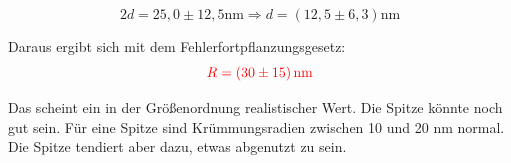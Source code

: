 \begin{equation*}
    2d = 25,0\pm12,5\mathrm{nm} \Rightarrow d = (12,5\pm 6,3) \mathrm{nm} 
\end{equation*}

Daraus ergibt sich mit dem Fehlerfortpflanzungsgesetz:\\

\begin{equation}
    \textcolor{red}{R = (30\pm15) \mathrm{\,nm}}
\end{equation}

Das scheint ein in der Größenordnung realistischer Wert. Die Spitze könnte noch gut sein. Für eine Spitze sind Krümmungsradien zwischen 
10 und 20 nm normal. Die Spitze tendiert aber dazu, etwas abgenutzt zu sein.